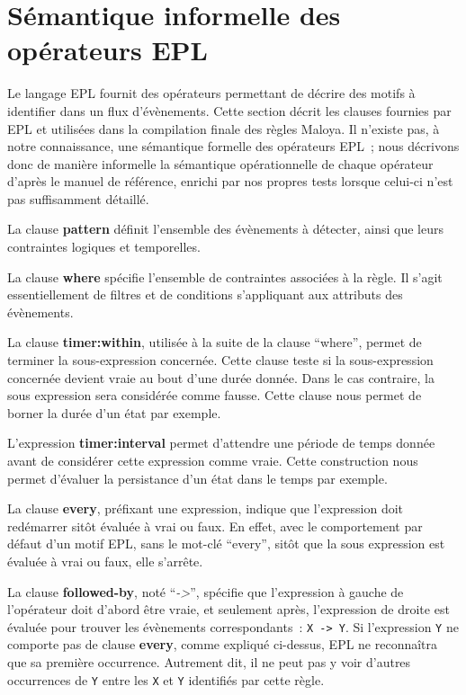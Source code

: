 \section{Sémantique informelle des opérateurs EPL}
Le langage EPL fournit des opérateurs permettant de décrire des motifs à identifier dans un flux d'évènements. Cette section décrit les clauses fournies par EPL et utilisées dans la compilation finale des règles Maloya. Il n'existe pas, à notre connaissance, une sémantique formelle des opérateurs EPL~; nous décrivons donc de manière informelle la sémantique opérationnelle de chaque opérateur d'après le manuel de référence, enrichi par nos propres tests lorsque celui-ci n'est pas suffisamment détaillé.
\newline

La clause {\bf pattern} définit l’ensemble des évènements à détecter, ainsi que leurs
contraintes logiques et temporelles.%
\newline

La clause {\bf where} spécifie l’ensemble de contraintes associées à la règle. Il s’agit essentiellement de filtres et de conditions s’appliquant aux attributs des évènements.
\newline

La clause {\bf timer:within}, utilisée à la suite de la clause ``where'', permet de terminer la sous-expression concernée. Cette clause teste si la sous-expression concernée devient vraie au bout d'une durée donnée. Dans le cas contraire, la sous expression sera considérée comme fausse. Cette clause nous permet de borner la durée d'un état par exemple.
\newline

L'expression {\bf timer:interval} permet d'attendre une période de temps donnée avant de considérer cette expression comme vraie. Cette construction nous permet d'évaluer la persistance d'un état dans le temps par exemple.
\newline

La clause {\bf every}, préfixant une expression, indique que l'expression doit redémarrer sitôt évaluée à vrai ou faux. En effet, avec le comportement par défaut d'un motif EPL, sans le mot-clé ``every'', sitôt que la sous expression est évaluée à vrai ou faux, elle s'arrête.
\newline

La clause {\bf followed-by}, noté ``{\em ->}'', spécifie que l'expression à gauche de l'opérateur doit d'abord être vraie, et seulement après, l'expression de droite est évaluée pour trouver les évènements correspondants~: {\tt X~->~Y}.
Si l'expression {\tt Y} ne comporte pas de clause {\bf every}, comme expliqué ci-dessus, EPL ne reconnaîtra que sa première occurrence. Autrement dit, il ne peut pas y voir d'autres occurrences de {\tt Y} entre les {\tt X} et {\tt Y} identifiés par cette règle.
\newline

